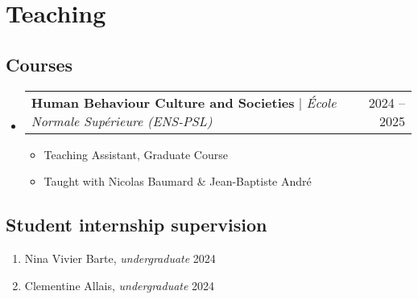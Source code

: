 \documentclass[letterpaper,11pt]{article}
\makeatletter
\newcommand{\resumeItem}[1]{
  \item\small{
    {#1 \vspace{-2pt}}
  }
}
\newcommand{\resumeItemWithYear}[3][ ]{ %
  \item\small{
    #2 \hfill {\small #3} \\
    #1
  }
}
\newcommand{\resumePublicationHeading}[1]{
  \vspace{5pt} %
  \noindent\textbf{\small #1} %
  \vspace{2pt} %
}
\newcommand{\resumeProjectHeading}[2]{
    \item
    \begin{tabular*}{0.97\textwidth}{l@{\extracolsep{\fill}}r}
      \small#1 & #2 \\
    \end{tabular*}\vspace{-7pt}
}
\newcommand{\resumeSubHeadingListStart}{\begin{itemize}[leftmargin=0.15in, label={}]}
\newcommand{\resumeSubHeadingListEnd}{\end{itemize}}
\newcommand{\resumeItemListStart}{\begin{itemize}}
\newcommand{\resumeItemListEnd}{\end{itemize}\vspace{-5pt}}
\makeatother
\begin{document}

\section{Teaching}

\subsection*{Courses}
    \resumeSubHeadingListStart
      \resumeProjectHeading
          {\textbf{Human Behaviour Culture and Societies} $|$ \emph{École Normale Supérieure (ENS-PSL)}}{2024 -- 2025}
          \resumeItemListStart
            \resumeItem{Teaching Assistant, Graduate Course}
            \resumeItem{Taught with Nicolas Baumard \& Jean-Baptiste André}
          \resumeItemListEnd
    \resumeSubHeadingListEnd


\subsection*{Student internship supervision}
\begin{enumerate}
    \resumeItemWithYear{Nina Vivier Barte, \textit{undergraduate}}{2024}
    \resumeItemWithYear{Clementine Allais, \textit{undergraduate}}{2024}
\end{enumerate}
\end{document}
